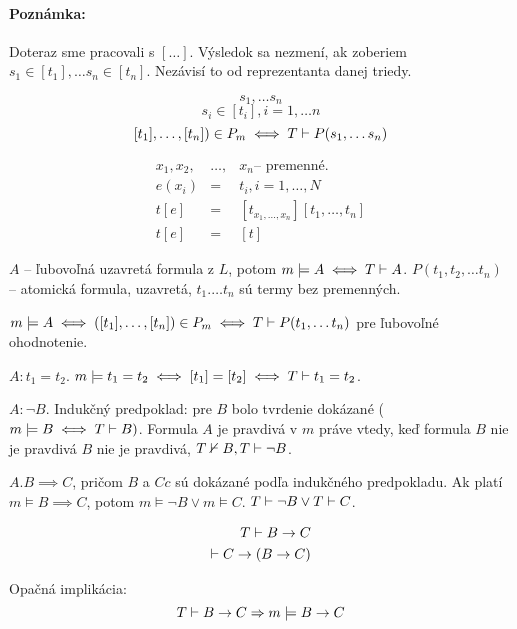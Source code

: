 \paragraph{Poznámka:} Doteraz sme pracovali s $[\ldots]$. Výsledok sa nezmení,
ak zoberiem $s_1 \in [t_1], \ldots s_n \in [t_n]$. Nezávisí to od reprezentanta
danej triedy.
\par
$$ s_1, \ldots s_n $$
$$ s_i \in [t_i], i = 1, \ldots n $$
$$ [t_1], \ldots, [t_n]) \in P_m \iff T \vdash P(s_1, \dots s_n) $$

\par

\begin{align*}
    x_1, x_2, &\ldots,& x_n \mbox{-- premenné}.	\\
    e(x_i) &=& t_i, i=1,\ldots,N	\\
    t[e] &=& [t_{x_1,\ldots,x_n}][t_1,\ldots, t_n]	\\
    t[e] &=& [t]
\end{align*}

$A$ -- ľubovoľná uzavretá formula z $L$, potom $m \models A \iff T \vdash A$.
$P(t_1, t_2, \ldots t_n)$ -- atomická formula,  uzavretá, $t_1. \ldots t_n$ sú
termy bez premenných.

$m \models A \iff ([t_1], \ldots, [t_n]) \in P_m \iff T \vdash P(t_1,\ldots
t_n)$ pre ľubovoľné ohodnotenie.

\par $A: t_1 = t_2$. $m \models t_1 = t_2 \iff [t_1] = [t_2] \iff T \vdash t_1 =
t_2$.

\par $A: \neg B$. Indukčný predpoklad: pre $B$ bolo tvrdenie dokázané ($m\models
B \iff T \vdash B)$. Formula $A$ je pravdivá v $m$ práve vtedy, keď formula $B$
nie je pravdivá $B$ nie je pravdivá, $T \nvdash B, T \vdash \neg B$.

\par $A. B \implies C$, pričom $B$ a $Cc$ sú dokázané podľa indukčného
predpokladu. Ak platí $m \models B \implies C$, potom $m \models \neg B \lor m
\models C$. $T \vdash \neg B \lor T \vdash C$.

\begin{align*}
    T \vdash B \rightarrow C \\
    \vdash C \rightarrow (B \rightarrow C)
\end{align*}

Opačná implikácia:
\begin{equation*}
    T\vdash B\rightarrow C\Rightarrow m \models B \rightarrow C
\end{equation*}

